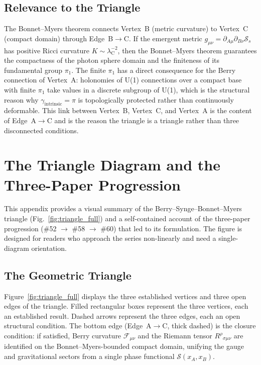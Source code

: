 \documentclass[%
 reprint, amsmath,amssymb, aps, prd, ]{revtex4-2}
\numberwithin{equation}{section}
\newcommand{\lambdaC}{\lambda_{\mathrm{C}}}
\newcommand{\BerryF}{\mathcal{F}}
\newcommand{\SyngeS}{\mathcal{S}}
\begin{document}
\subsection{Relevance to the Triangle}

The Bonnet--Myers theorem connects Vertex~B (metric curvature) to Vertex~C (compact domain) through Edge~B$\to$C.
If the emergent metric $g_{\mu\nu} = \partial_{A\mu}\partial_{B\nu}\SyngeS_s$ has positive Ricci curvature $K \sim \lambdaC^{-2}$, then the Bonnet--Myers theorem guarantees the compactness of the photon sphere domain and the finiteness of its fundamental group $\pi_1$.
The finite $\pi_1$ has a direct consequence for the Berry connection of Vertex~A: holonomies of U(1) connections over a compact base with finite $\pi_1$ take values in a discrete subgroup of U(1), which is the structural reason why $\gamma_\mathrm{intrinsic} = \pi$ is topologically protected rather than continuously deformable.
This link between Vertex~B, Vertex~C, and Vertex~A is the content of Edge~A$\to$C and is the reason the triangle is a triangle rather than three disconnected conditions.

\section{The Triangle Diagram and the Three-Paper Progression}
\label{app:triangle_figure}

This appendix provides a visual summary of the Berry--Synge--Bonnet--Myers triangle (Fig.~\ref{fig:triangle_full}) and a self-contained account of the three-paper progression (\#52 $\to$ \#58 $\to$ \#60) that led to its formulation.
The figure is designed for readers who approach the series non-linearly and need a single-diagram orientation.

\subsection{The Geometric Triangle}

Figure~\ref{fig:triangle_full} displays the three established vertices and three open edges of the triangle.
Filled rectangular boxes represent the three vertices, each an established result.
Dashed arrows represent the three edges, each an open structural condition.
The bottom edge (Edge~A$\to$C, thick dashed) is the closure condition: if satisfied, Berry curvature $\BerryF_{\mu\nu}$ and the Riemann tensor $R^\rho{}_{\sigma\mu\nu}$ are identified on the Bonnet--Myers-bounded compact domain, unifying the gauge and gravitational sectors from a single phase functional $\SyngeS(x_A, x_B)$.
\end{document}
